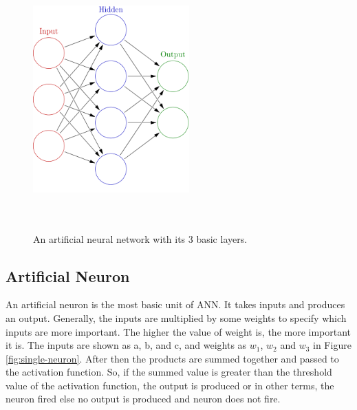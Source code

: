 \begin{figure}[htpb]
	\centering
	\includegraphics[width=6cm,height=10cm,keepaspectratio=true]{images/neural-net}
	\caption{
		An artificial neural network with its 3 basic layers\cite{wiki:ann}.
	}
	\label{fig:wiki:ann}
\end{figure}


\subsection{Artificial Neuron}
An artificial neuron is the most basic unit of ANN. It takes inputs and produces an output. Generally, the inputs are multiplied by some weights to specify which inputs are more important. The higher the value of weight is, the more important it is. The inputs are shown as a, b, and c, and weights as $w_1$, $w_2$ and $w_3$ in Figure \ref{fig:single-neuron}. After then the products are summed together and passed to the activation function. So, if the summed value is greater than the threshold value of the activation function, the output is produced or in other terms, the neuron fired else no output is produced and neuron does not fire.

